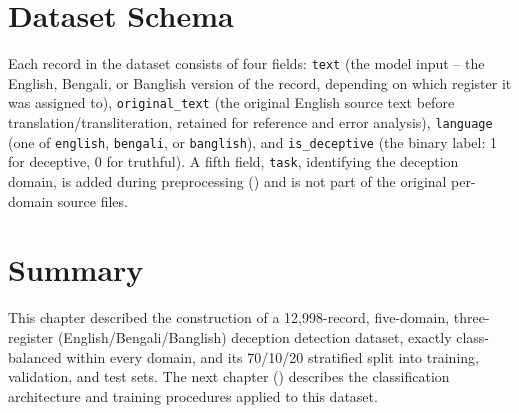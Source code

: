 \section{Dataset Schema}
\label{sec:dataset-schema}

Each record in the dataset consists of four fields: \texttt{text} (the model input -- the English, Bengali, or Banglish version of the record, depending on which register it was assigned to), \texttt{original\_text} (the original English source text before translation/transliteration, retained for reference and error analysis), \texttt{language} (one of \texttt{english}, \texttt{bengali}, or \texttt{banglish}), and \texttt{is\_deceptive} (the binary label: 1 for deceptive, 0 for truthful). A fifth field, \texttt{task}, identifying the deception domain, is added during preprocessing () and is not part of the original per-domain source files.

\section{Summary}

This chapter described the construction of a 12{,}998-record, five-domain, three-register (English/Bengali/Banglish) deception detection dataset, exactly class-balanced within every domain, and its 70/10/20 stratified split into training, validation, and test sets. The next chapter () describes the classification architecture and training procedures applied to this dataset.
